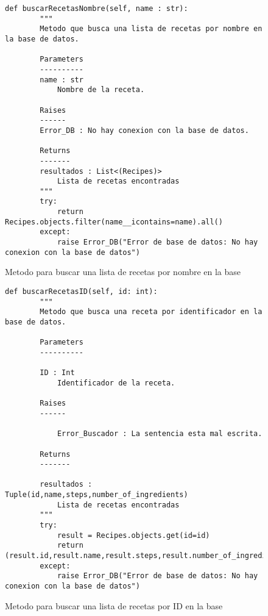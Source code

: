 \begin{figure}[H]
    \begin{lstlisting}[style=python]
        def buscarRecetasNombre(self, name : str):
        """
        Metodo que busca una lista de recetas por nombre en la base de datos.

        Parameters
        ----------
        name : str
            Nombre de la receta.

        Raises
        ------
        Error_DB : No hay conexion con la base de datos.

        Returns
        -------
        resultados : List<(Recipes)>
            Lista de recetas encontradas
        """
        try:
            return Recipes.objects.filter(name__icontains=name).all()
        except:
            raise Error_DB("Error de base de datos: No hay conexion con la base de datos")
    \end{lstlisting}
    \caption{Metodo para buscar una lista de recetas por nombre en la \gls{base}}
    \label{sni:buscarRecetaNombre}
\end{figure}
\begin{figure}[H]
    \begin{lstlisting}[style=python]
        def buscarRecetasID(self, id: int):
        """
        Metodo que busca una receta por identificador en la base de datos.

        Parameters
        ----------

        ID : Int
            Identificador de la receta.

        Raises
        ------

            Error_Buscador : La sentencia esta mal escrita.

        Returns
        -------
            
        resultados : Tuple(id,name,steps,number_of_ingredients)
            Lista de recetas encontradas
        """
        try:
            result = Recipes.objects.get(id=id)
            return (result.id,result.name,result.steps,result.number_of_ingredients)
        except:
            raise Error_DB("Error de base de datos: No hay conexion con la base de datos")
    \end{lstlisting}
    \caption{Metodo para buscar una lista de recetas por ID en la \gls{base}}
    \label{sni:buscarRecetaID}
\end{figure}

